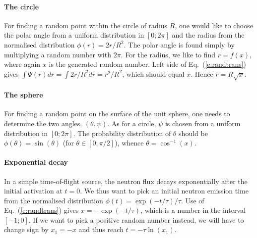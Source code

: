 \paragraph{The circle}
For finding a random point within the
circle of radius $R$, one would like to choose the polar angle from a uniform
distribution in $[0; 2\pi]$ and the radius from the normalised distribution
$\phi(r)=2r/R^2$.
The polar angle is found simply by multiplying a random number
with $2\pi$. For the radius, we like to find $r=f(x)$, where again $x$
is the generated random number. Left side of Eq.~(\ref{e:randtrans}) gives
$\int \Psi(r) dr = \int 2 r/R^2 dr = r^2/R^2$, which should equal $x$.
Hence $r = R\sqrt{x}$.

\paragraph{The sphere}
For finding a random point on the surface of the unit sphere,
one needs to determine the two angles, $(\theta, \psi)$.
As for a circle, $\psi$ is chosen from a uniform distribution
in $[0; 2\pi]$. The probability distribution of $\theta$ should be
$\phi(\theta)=\sin(\theta)$ (for $\theta \in [0; \pi/2 ]$),
whence $\theta=\cos^{-1}(x)$.

\paragraph{Exponential decay}
In a simple time-of-flight source, the neutron flux decays exponentially
after the initial activation at $t=0$. We thus want to pick an initial
neutron emission time from the normalised distribution
$\phi(t) = \exp(-t/\tau) / \tau$.
Use of Eq.~(\ref{e:randtrans}) gives
$x = - \exp(-t/\tau)$, which is a number in the interval $[-1; 0]$.
If we want to pick a positive random number instead, we will have
to change sign by $x_1 = -x$ and thus reach $t = - \tau \ln (x_1)$.
